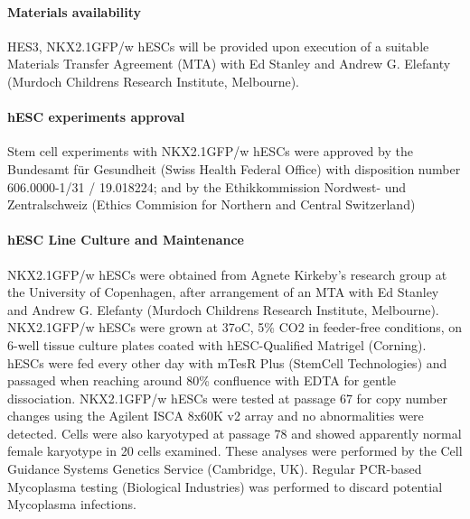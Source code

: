 \paragraph{Materials availability}
HES3, NKX2.1GFP/w hESCs will be provided upon execution of a suitable Materials Transfer Agreement (MTA) with Ed Stanley and Andrew G. Elefanty (Murdoch Childrens Research Institute, Melbourne).

\paragraph{hESC experiments approval}
Stem cell experiments with NKX2.1GFP/w hESCs were approved by the Bundesamt für Gesundheit (Swiss Health Federal Office) with disposition number 606.0000-1/31 / 19.018224; and by the Ethikkommission Nordwest- und Zentralschweiz (Ethics Commision for Northern and Central Switzerland)

\paragraph{hESC Line Culture and Maintenance}
NKX2.1GFP/w hESCs were obtained from Agnete Kirkeby’s research group at the University of Copenhagen, after arrangement of an MTA with Ed Stanley and Andrew G. Elefanty (Murdoch Childrens Research Institute, Melbourne). NKX2.1GFP/w hESCs were grown at 37oC, 5\% CO2 in feeder-free conditions, on 6-well tissue culture plates coated with hESC-Qualified Matrigel (Corning). hESCs were fed every other day with mTesR Plus (StemCell Technologies) and passaged when reaching around 80\% confluence with EDTA for gentle dissociation. NKX2.1GFP/w hESCs were tested at passage 67 for copy number changes using the Agilent ISCA 8x60K v2 array and no abnormalities were detected. Cells were also karyotyped at passage 78 and showed apparently normal female karyotype in 20 cells examined. These analyses were performed by the Cell Guidance Systems Genetics Service (Cambridge, UK). Regular PCR-based Mycoplasma testing (Biological Industries) was performed to discard potential Mycoplasma infections.

